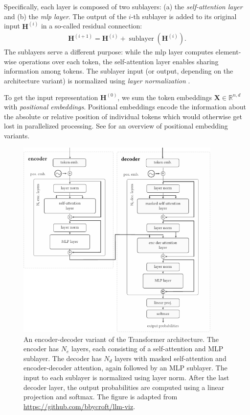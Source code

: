 Specifically, each layer is composed of two sublayers: (a) the \emph{self-attention layer} and (b) the \emph{\ac{mlp} layer}. The output of the $i$-th sublayer is added to its original input $\mathbf{H}^{(i)}$ in a so-called residual connection:
\begin{align}
    \mathbf{H}^{(i+1)} = \mathbf{H}^{(i)} + \operatorname{sublayer}(\mathbf{H}^{(i)}).
\end{align}
The sublayers serve a different purpose: while the \ac{mlp} layer computes element-wise operations over each token, the self-attention layer enables sharing information among tokens. The sublayer input (or output, depending on the architecture variant) is normalized using \emph{layer normalization} \cite{ba2016layer}.

To get the input representation $\mathbf{H}^{(0)}$, we sum the token embeddings $\mathbf{X} \in \mathbb{R}^{n,d}$ with \emph{positional embeddings}. Positional embeddings encode the information about the absolute or relative position of individual tokens which would otherwise get lost in parallelized processing. See \citet{dufter2022position} for an overview of positional embedding variants.


\begin{figure}[ht]
    \centering
    \includegraphics[width=0.9\textwidth]{img/transformer.pdf}
    \caption{An encoder-decoder variant of the Transformer architecture. The encoder has $N_{e}$ layers, each consisting of a self-attention and MLP sublayer. The decoder has $N_{d}$ layers with masked self-attention and encoder-decoder attention, again followed by an MLP sublayer. The input to each sublayer is normalized using layer norm. After the last decoder layer, the output probabilities are computed using a linear projection and softmax. The figure is adapted from \href{https://github.com/bbycroft/llm-viz/blob/main/src/llm/intro-image.svg}{https://github.com/bbycroft/llm-viz}.}
    \label{fig:transformer}
\end{figure}



